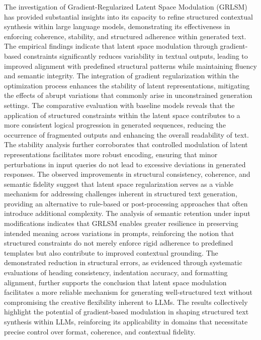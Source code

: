 \documentclass{article}
\begin{document}
The investigation of Gradient-Regularized Latent Space Modulation (GRLSM) has provided substantial insights into its capacity to refine structured contextual synthesis within large language models, demonstrating its effectiveness in enforcing coherence, stability, and structured adherence within generated text. The empirical findings indicate that latent space modulation through gradient-based constraints significantly reduces variability in textual outputs, leading to improved alignment with predefined structural patterns while maintaining fluency and semantic integrity. The integration of gradient regularization within the optimization process enhances the stability of latent representations, mitigating the effects of abrupt variations that commonly arise in unconstrained generation settings. The comparative evaluation with baseline models reveals that the application of structured constraints within the latent space contributes to a more consistent logical progression in generated sequences, reducing the occurrence of fragmented outputs and enhancing the overall readability of text. The stability analysis further corroborates that controlled modulation of latent representations facilitates more robust encoding, ensuring that minor perturbations in input queries do not lead to excessive deviations in generated responses. The observed improvements in structural consistency, coherence, and semantic fidelity suggest that latent space regularization serves as a viable mechanism for addressing challenges inherent in structured text generation, providing an alternative to rule-based or post-processing approaches that often introduce additional complexity. The analysis of semantic retention under input modifications indicates that GRLSM enables greater resilience in preserving intended meaning across variations in prompts, reinforcing the notion that structured constraints do not merely enforce rigid adherence to predefined templates but also contribute to improved contextual grounding. The demonstrated reduction in structural errors, as evidenced through systematic evaluations of heading consistency, indentation accuracy, and formatting alignment, further supports the conclusion that latent space modulation facilitates a more reliable mechanism for generating well-structured text without compromising the creative flexibility inherent to LLMs. The results collectively highlight the potential of gradient-based modulation in shaping structured text synthesis within LLMs, reinforcing its applicability in domains that necessitate precise control over format, coherence, and contextual fidelity.




\end{document}

